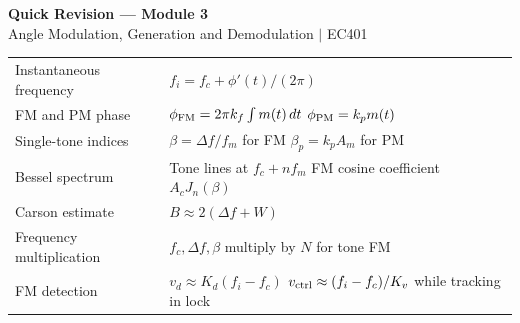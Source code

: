 \documentclass[12pt,a4paper]{article}
\renewcommand{\arraystretch}{1.45}
\begin{document}
\newpage
\begin{center}
  {\large\bfseries\color{myred} Quick Revision --- Module 3}\\[3pt]
  {\small\color{mydark} Angle Modulation, Generation and Demodulation $|$ EC401}
\end{center}
\noindent{\color{myred}\rule{\linewidth}{1.2pt}}
\par\vspace{4pt}

\begin{tcolorbox}[formulabox, title={Key Formulas at a Glance}]
\renewcommand{\arraystretch}{1.35}
\noindent\begin{tabularx}{\linewidth}{B{4.4cm} Y}
Instantaneous frequency & $f_i=f_c+\phi'(t)/(2\pi)$ \\[4pt]
FM and PM phase & $\phi_{\rm FM}=2\pi k_f\int m(t)\,dt$ \newline $\phi_{\rm PM}=k_pm(t)$ \\[4pt]
Single-tone indices & $\beta=\Delta f/f_m$ for FM \quad $\beta_p=k_pA_m$ for PM \\[4pt]
Bessel spectrum & Tone lines at $f_c+nf_m$ \newline FM cosine coefficient $A_cJ_n(\beta)$ \\[4pt]
Carson estimate & $B\approx 2(\Delta f+W)$ \\[4pt]
Frequency multiplication & $f_c,\Delta f,\beta$ multiply by $N$ for tone FM \\[4pt]
FM detection & $v_d\approx K_d(f_i-f_c)$ \newline $v_{\rm ctrl}\approx(f_i-f_c)/K_v$ while tracking in lock \\[4pt]
\end{tabularx}\par
\end{tcolorbox}
\end{document}
